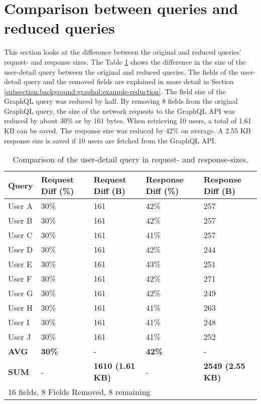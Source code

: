 \section{Comparison between queries and reduced queries}

This section looks at the difference between the original and reduced queries' request- and response sizes. The Table \ref{table:code:comparison-user-reduction} shows the difference in the size of the user-detail query between the original and reduced queries. The fields of the user-detail query and the removed fields are explained in more detail in Section \ref{subsection:background:graphql:example-reduction}.
The field size of the GraphQL query was reduced by half. By removing 8 fields from the original GraphQL query, the size of the network requests to the GraphQL \ac{API} was reduced by about 30\% or by 161 bytes. When retrieving 10 users, a total of 1.61 KB can be saved. The response size was reduced by 42\% on average. A 2.55 KB response size is saved if 10 users are fetched from the GraphQL \ac{API}.

\ifshowTables
\begin{table}[H]
  \begin{tabular}{|l|l|l|l|l|}
  \hline
  \textbf{Query} & \textbf{Request Diff (\%)} & \textbf{Request Diff (B)} & \textbf{Response Diff (\%)} & \textbf{Response Diff (B)} \\
  \hline
  User A & 30\% & 161 & 42\% & 257 \\
  \hline
  User B & 30\% & 161 & 42\% & 257 \\
  \hline
  User C & 30\% & 161 & 41\% & 257 \\
  \hline
  User D & 30\% & 161 & 42\% & 244 \\
  \hline
  User E & 30\% & 161 & 43\% & 251 \\
  \hline
  User F & 30\% & 161 & 42\% & 271 \\
  \hline
  User G & 30\% & 161 & 42\% & 249 \\
  \hline
  User H & 30\% & 161 & 41\% & 263 \\
  \hline
  User I & 30\% & 161 & 41\% & 248 \\
  \hline
  User J & 30\% & 161 & 41\% & 252 \\
  \hline
  \hline
  \textbf{AVG} & \textbf{30\%} & - & \textbf{42\%} & -  \\
  \hline
  \hline
  \textbf{SUM} & - & \textbf{1610 (1.61 KB)} & - & \textbf{2549 (2.55 KB)} \\
  \hline
  \multicolumn{5}{l}{16 fields, 8 Fields Removed, 8 remaining}
  \end{tabular}
  \caption{Comparison of the user-detail query in request- and response-sizes.}\label{table:code:comparison-user-reduction}
\end{table}
\fi

